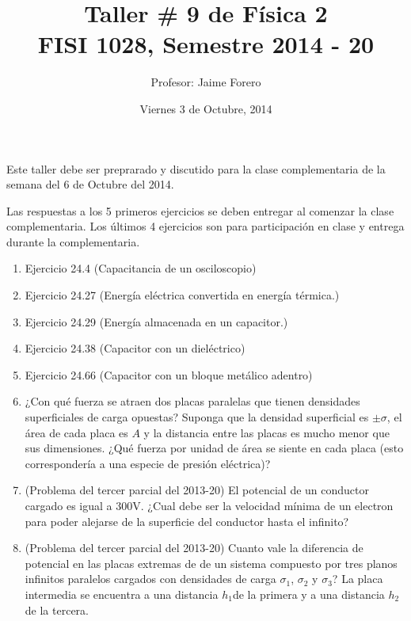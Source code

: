 \documentclass{article}
\title{Taller \# 9 de F\'isica 2\\ FISI 1028, Semestre 2014 - 20}
\author{Profesor: Jaime Forero}
\date{Viernes 3 de Octubre, 2014}
\begin{document}
\maketitle
\thispagestyle{empty}

\noindent

Este taller debe ser preprarado y discutido para la clase
complementaria de la semana del 6 de Octubre del 2014.


Las respuestas a los 5 primeros ejercicios se deben entregar al comenzar la
clase complementaria. Los \'ultimos 4 ejercicios son para
participaci\'on en clase y entrega durante la complementaria. 

\begin{enumerate}

\item
Ejercicio 24.4 (Capacitancia de un osciloscopio)

\item
Ejercicio 24.27 (Energ\'ia el\'ectrica convertida en energ\'ia t\'ermica.)

\item
Ejercicio 24.29 (Energ\'ia almacenada en un capacitor.)

\item
Ejercicio 24.38 (Capacitor con un diel\'ectrico)

\item
Ejercicio 24.66 (Capacitor con un bloque met\'alico adentro)

\item ¿Con qu\'e fuerza se atraen dos placas paralelas que tienen densidades superficiales de carga opuestas? Suponga que la densidad superficial es $\pm \sigma$, el \'area de cada placa es $A$ y la distancia entre las placas es mucho menor que sus dimensiones. ¿Qué fuerza por unidad de área se siente en cada placa (esto correspondería a una especie de presión eléctrica)?

\item  (Problema del tercer parcial del 2013-20) El potencial de un conductor cargado es igual a
  300V. ¿Cual debe ser la velocidad m\'inima de un electron para poder
  alejarse de la superficie del conductor hasta el infinito?


\item (Problema del tercer parcial del 2013-20) Cuanto vale la diferencia de potencial en las placas
  extremas de de un sistema compuesto por tres planos infinitos
  paralelos cargados con densidades de carga $\sigma_1$, $\sigma_2$ y
  $\sigma_3$? La placa intermedia se encuentra a una distancia
  $h_1$de la primera y a una distancia $h_2$ de la tercera. 


\end{enumerate}
\end{document}
